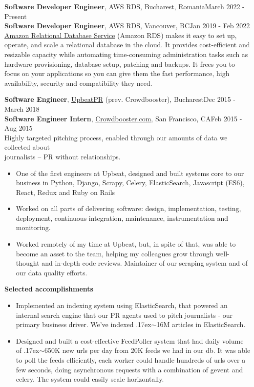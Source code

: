 \documentclass[line, margin]{resume}
\newcommand{\bettertilde}{\raise.17ex\hbox{$\scriptstyle\mathtt{\sim}$}}
\begin{document}
\begin{resume}
\textbf{Software Developer Engineer}, \href{https://aws.amazon.com/}{AWS RDS}, Bucharest, Romania\hfill March 2022 - Present\\
\textbf{Software Developer Engineer}, \href{https://aws.amazon.com/}{AWS RDS}, Vancouver, BC\hfill Jan 2019 - Feb 2022 \\
\href{https://aws.amazon.com/rds/}{Amazon Relational Database Service} (Amazon RDS) makes it easy to set up, operate, and scale a relational database in the cloud. It provides cost-efficient and resizable capacity while automating time-consuming administration tasks such as hardware provisioning, database setup, patching and backups. It frees you to focus on your applications so you can give them the fast performance, high availability, security and compatibility they need.

\textbf{Software Engineer}, \href{http://upbeatpr.com}{UpbeatPR} (prev. Crowdbooster), Bucharest\hfill Dec 2015 - March 2018\\
\textbf{Software Engineer Intern}, \href{http://crowdbooster.com/}{Crowdbooster.com}, San Francisco, CA\hfill Feb 2015 - Aug 2015\\
Highly targeted pitching process, enabled through our amounts of data we collected about\\ journalists -- PR without relationships.
\begin{itemize} \itemsep -2pt  %
	\item One of the first engineers at Upbeat, designed and built systems core to our business in Python, Django, Scrapy, Celery, ElasticSearch, Javascript (ES6), React, Redux and Ruby on Rails
    \item Worked on all parts of delivering software: design, implementation, testing, deployment, continuous integration, maintenance, instrumentation and monitoring.
	\item Worked remotely  of my time at Upbeat, but, in spite of that, was able to become an asset to the team, helping my colleagues grow through well-thought and in-depth code reviews. Maintainer of our scraping system and of our data quality efforts.
\end{itemize}\vspace{-2.5mm}
\textbf{Selected accomplishments}
\begin{itemize} \itemsep -2pt  %
	\item Implemented an indexing system using ElasticSearch, that powered an internal search engine that our PR agents used to pitch journalists - our primary business driver. We've indexed \bettertilde16M articles in ElasticSearch.
	\item Designed and built a cost-effective FeedPoller system that had daily volume of \bettertilde650K new urls per day from 20K feeds we had in our db. It was able to poll the feeds efficiently, each worker could handle hundreds of urls over a few seconds, doing asynchronous requests with a combination of gevent and celery. The system could easily scale horizontally.
\end{itemize}


\end{resume}
\end{document}
